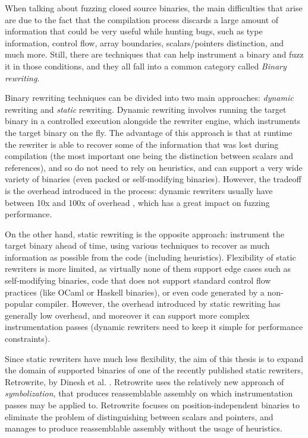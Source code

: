 \documentclass[a4paper,11pt,oneside]{report}
\begin{document}
When talking about fuzzing closed source binaries, the main difficulties that 
arise are due to the fact that the compilation process discards a large amount 
of information that could be very useful while hunting bugs, such as type 
information, control flow, array boundaries, scalars/pointers distinction, and 
much more.  Still, there are techniques that can help instrument a binary and 
fuzz it in those conditions, and they all fall into a common category called 
\emph{Binary rewriting}.

Binary rewriting techniques can be divided into two main approaches: 
\emph{dynamic} rewriting and \emph{static} rewriting. Dynamic rewriting 
involves running the target binary in a controlled execution alongside the 
rewriter engine, which instruments the target binary on the fly. The advantage 
of this approach is that at runtime the rewriter is able to recover some of the 
information that was lost during compilation (the most important one being the 
distinction between scalars and references), and so do not need to rely on 
heuristics, and can support a very wide variety of binaries (even packed or 
self-modifying binaries). However, the tradeoff is the overhead introduced in 
the process: dynamic rewriters usually have between 10x and 100x of overhead 
\cite{dinesh20oakland}, which has a great impact on fuzzing performance. 

On the other hand, static rewriting is the opposite approach: instrument the 
target binary ahead of time, using various techniques to recover as much 
information as possible from the code (including heuristics). Flexibility of 
static rewriters is more limited, as virtually none of them support edge cases 
such as self-modifying binaries, code that does not support standard control 
flow practices (like OCaml or Haskell binaries), or even code generated by a 
non-popular compiler. However, the overhead introduced by static rewriting has 
generally low overhead, and moreover it can support more complex 
instrumentation passes (dynamic rewriters need to keep it simple for 
performance constraints). 

Since static rewriters have much less flexibility, the aim of this thesis is to 
expand the domain of supported binaries of one of the recently published static 
rewriters, Retrowrite, by Dinesh et al. \cite{dinesh20oakland}. Retrowrite uses 
the relatively new approach of \emph{symbolization}, that produces 
reassemblable assembly on which instrumentation passes may be applied to.  
Retrowrite focuses on position-independent binaries to eliminate the problem of 
distinguishing between scalars and pointers, and manages to produce 
reassemblable assembly without the usage of heuristics. 
\end{document}

